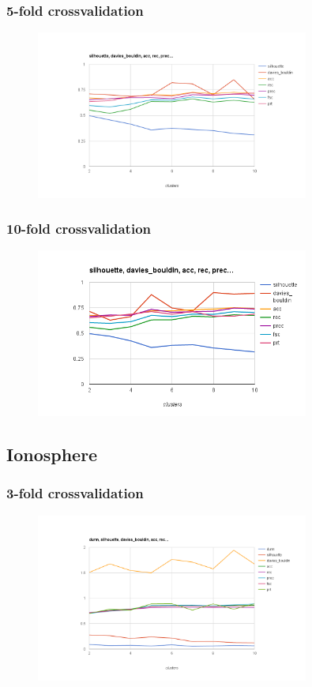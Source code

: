 \documentclass{article}
\begin{document}
\subsubsection{5-fold crossvalidation}
\begin{figure}[p]
    \centering
    \includegraphics[width=0.8\textwidth]{kmeans_diabetes.arff_5}
\end{figure}
\subsubsection{10-fold crossvalidation}
\begin{figure}[p]
    \centering
    \includegraphics[width=0.8\textwidth]{kmeans_diabetes.arff_10}
\end{figure}
\subsection{Ionosphere}
\subsubsection{3-fold crossvalidation}
\begin{figure}[p]
    \centering
    \includegraphics[width=0.8\textwidth]{kmeans_ionosphere.arff_3}
\end{figure}
\end{document}
